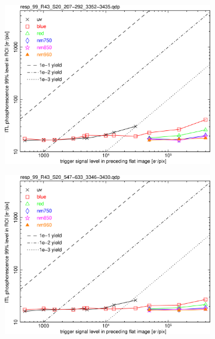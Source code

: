 \begin{figure}[!htbp]
\centering
\begin{subfigure}{0.45\textwidth}    
  \centering
  \includegraphics[width=\textwidth]{figures/phosphorescence-survey/phos_resp/resp_99_R43_S20_207-292_3352-3435.png}    
\end{subfigure}
\newline
\centering
\begin{subfigure}{0.45\textwidth}    
  \centering
  \includegraphics[width=\textwidth]{figures/phosphorescence-survey/phos_resp/resp_99_R43_S20_547-633_3346-3430.png}    
\end{subfigure}
\newline

\end{figure}
